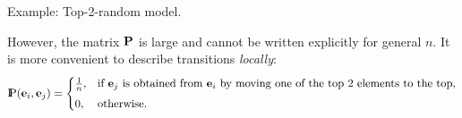 \documentclass[aspectratio=169]{beamer}
\newcommand{\Prob}{{\rm I\hspace{-0.8mm}P}}
\newcommand{\e}[0]{\textbf{e}}
\begin{document}
\begin{frame}{Example: Top-2-random model.}


\medskip
However, the matrix \(\mathbf{P}\) is large and cannot be written explicitly for general \(n\).
It is more convenient to describe transitions \emph{locally}:
\[
\Prob(\e_i,\e_j) =
\begin{cases}
\tfrac1n, & \text{if } \e_j \text{ is obtained from } \e_i \text{ by moving one of the top 2 elements to the top},\\[4pt]
0, & \text{otherwise.}
\end{cases}
\]

\begin{center}
\end{center}

\end{frame}
\end{document}

